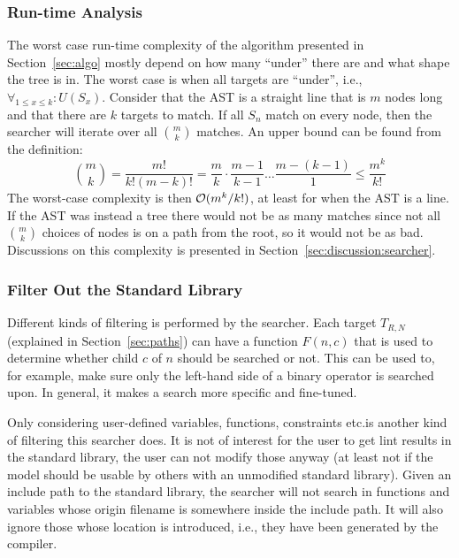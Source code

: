 \documentclass[a4paper,12pt]{article}
\begin{document}
\subsubsection{Run-time Analysis}\label{sec:algo:anal}
The worst case run-time complexity of the algorithm presented in Section~\ref{sec:algo}
mostly depend on how many ``under'' there are and what shape the
tree is in. The worst case is when all targets are ``under'', i.e., $\forall_{1 \leq x
  \leq k} : U(S_x)$. Consider that the AST is a straight line that is $m$
nodes long and that there are $k$ targets to match. If all $S_n$ match on every node, then the
searcher will iterate over all $\binom{m}{k}$ matches. An upper bound can be found from the
definition:
\begin{equation*}
  \binom{m}{k} = \frac{m!}{k! (m-k)!} = \frac{m}{k} \cdot \frac{m-1}{k-1} \dots \frac{m -
    (k-1)}{1} \leq \frac{m^k}{k!}
\end{equation*}%
The worst-case complexity is then $\mathcal{O} ({m^k}/{k!})$, at least for when the AST is a line.
If the AST was instead a tree there would not be as many matches since not all
$\binom{m}{k}$ choices of nodes is on a path from the root, so it would not be as bad.
Discussions on this complexity is presented in Section~\ref{sec:discussion:searcher}.

\subsubsection{Filter Out the Standard Library}\label{sec:filter:stdlib}
Different kinds of filtering is performed by the searcher. Each target $T_{R,N}$
(explained in Section~\ref{sec:paths}) can have a function $F(n,c)$ that is used to
determine whether child $c$ of $n$ should be searched or not. This can be used to, for
example, make sure only the left-hand side of a binary operator is searched upon. In
general, it makes a search more specific and fine-tuned.

Only considering user-defined variables, functions, constraints etc.\@ is another kind of
filtering this searcher does. It is not of interest for the user to get lint results in
the standard library, the user can not modify those anyway (at least not if the model should
be usable by others with an unmodified standard library). Given an include path to the
standard library, the searcher will not search in functions and variables whose origin
filename is somewhere inside the include path. It will also ignore those whose location is
introduced, i.e., they have been generated by the compiler.
\end{document}
